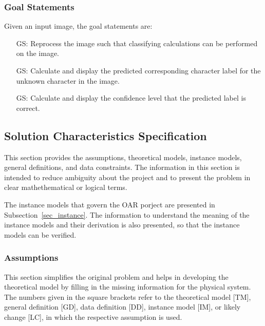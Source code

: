 \documentclass[12pt]{article}
\newcounter{goalnum} %
\begin{document}
\subsubsection{Goal Statements}

\noindent Given an input image, the goal statements are:

\begin{itemize}

\item[GS\refstepcounter{goalnum}\thegoalnum \label{GS1}:] Reprocess the image such that classifying
calculations can be performed on the image.

\item[GS\refstepcounter{goalnum}\thegoalnum \label{GS2}:] Calculate and display the predicted 
corresponding character label for the unknown character in the image.

 \item[GS\refstepcounter{goalnum}\thegoalnum \label{GS3}:] Calculate and display the confidence level that
 the predicted label is correct.

\end{itemize}

\subsection{Solution Characteristics Specification}

This section provides the assumptions, theoretical models, instance models, general definitions,
and data constraints. The information in this section is intended to reduce ambiguity about the project and 
to present the problem in clear mathethematical or logical terms.

The instance models that govern the OAR porject are presented in
Subsection~\ref{sec_instance}.  The information to understand the meaning of the
instance models and their derivation is also presented, so that the instance
models can be verified.

\subsubsection{Assumptions} \label{sec_assumpt}


This section simplifies the original problem and helps in developing the
theoretical model by filling in the missing information for the physical system.
The numbers given in the square brackets refer to the theoretical model [TM],
general definition [GD], data definition [DD], instance model [IM], or likely
change [LC], in which the respective assumption is used.
\end{document}
